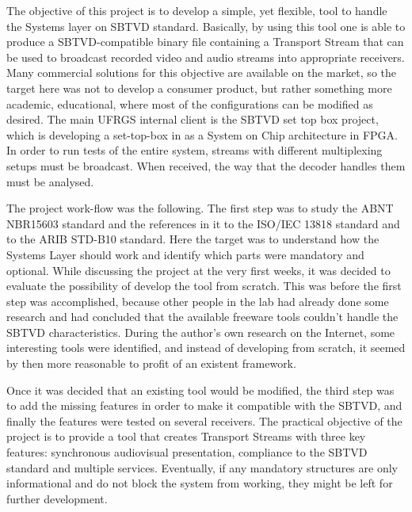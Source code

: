 \documentclass[
	12pt,				%
	openright,			%
	twoside,			%
	a4paper,			%
	brazil,
	french,				%
	english
	]{abntex2}
\begin{document}

The objective of this project is to develop a simple, yet flexible, tool to handle the Systems layer on SBTVD standard. Basically, by using this tool one is able to produce a SBTVD-compatible binary file containing a Transport Stream that can be used to broadcast recorded video and audio streams into appropriate receivers. Many commercial solutions for this objective are available on the market, so the target here was not to develop a consumer product, but rather something more academic, educational, where most of the configurations can be modified as desired. The main UFRGS internal client is the SBTVD set top box project, which is developing a set-top-box in as a System on Chip architecture in FPGA. In order to run tests of the entire system, streams with different multiplexing setups must be broadcast. When received, the way that the decoder handles them must be analysed.

The project work-flow was the following. The first step was to study the ABNT NBR15603 standard and the references in it to the ISO/IEC 13818 standard and to the ARIB STD-B10 standard. Here the target was to understand how the Systems Layer should work and identify which parts were mandatory and optional. While discussing the project at the very first weeks, it was decided to evaluate the possibility of develop the tool from scratch. This was before the first step was accomplished, because other people in the lab had already done some research and had concluded that the available freeware tools couldn't handle the SBTVD characteristics. During the author's own research on the Internet, some interesting tools were identified, and instead of developing from scratch, it seemed by then more reasonable to profit of an existent framework.

Once it was decided that an existing tool would be modified, the third step was to add the missing features in order to make it compatible with the SBTVD, and finally the features were tested on several receivers. The practical objective of the project is to provide a tool that creates Transport Streams with three key features: synchronous audiovisual presentation, compliance to the SBTVD standard and multiple services. Eventually, if any mandatory structures are only informational and do not block the system from working, they might be left for further development.
\end{document}

